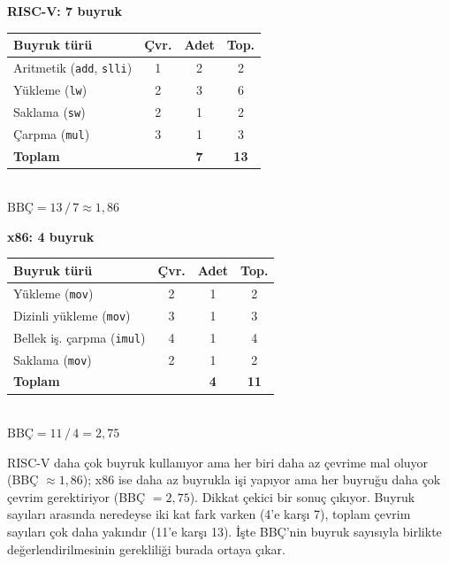 \begin{center}
\begin{minipage}[t]{0.46\textwidth}
\centering
\small
\textbf{RISC-V\!: 7 buyruk}\\[4pt]
\begin{tabular}{@{}lccc@{}}
\toprule
\textbf{Buyruk türü} & \textbf{Çvr.} & \textbf{Adet} & \textbf{Top.} \\
\midrule
Aritmetik (\texttt{add}, \texttt{slli}) & 1 & 2 & 2 \\
Yükleme (\texttt{lw})                   & 2 & 3 & 6 \\
Saklama (\texttt{sw})                    & 2 & 1 & 2 \\
Çarpma (\texttt{mul})                    & 3 & 1 & 3 \\
\midrule
\textbf{Toplam}                          &   & \textbf{7} & \textbf{13} \\
\bottomrule
\end{tabular}
\\[6pt]
$\text{BBÇ} = 13\,/\,7 \approx 1{,}86$
\end{minipage}
\hfill
\begin{minipage}[t]{0.50\textwidth}
\centering
\small
\textbf{x86\!: 4 buyruk}\\[4pt]
\begin{tabular}{@{}lccc@{}}
\toprule
\textbf{Buyruk türü} & \textbf{Çvr.} & \textbf{Adet} & \textbf{Top.} \\
\midrule
Yükleme (\texttt{mov})            & 2 & 1 & 2 \\
Dizinli yükleme (\texttt{mov})    & 3 & 1 & 3 \\
Bellek iş. çarpma (\texttt{imul}) & 4 & 1 & 4 \\
Saklama (\texttt{mov})            & 2 & 1 & 2 \\
\midrule
\textbf{Toplam}                    &   & \textbf{4} & \textbf{11} \\
\bottomrule
\end{tabular}
\\[6pt]
$\text{BBÇ} = 11\,/\,4 = 2{,}75$
\end{minipage}
\end{center}

RISC-V daha çok buyruk kullanıyor ama her biri daha az çevrime mal oluyor (BBÇ $\approx 1{,}86$); x86 ise daha az buyrukla işi yapıyor ama her buyruğu daha çok çevrim gerektiriyor (BBÇ $= 2{,}75$). Dikkat çekici bir sonuç çıkıyor. Buyruk sayıları arasında neredeyse iki kat fark varken (4'e karşı 7), toplam çevrim sayıları çok daha yakındır (11'e karşı 13). İşte BBÇ'nin buyruk sayısıyla birlikte değerlendirilmesinin gerekliliği burada ortaya çıkar.

